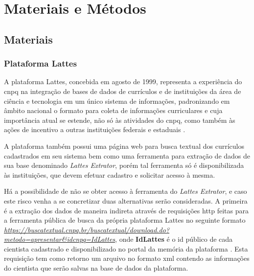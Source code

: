 \chapter{Materiais e Métodos}\label{cap:materialemetodos}

\section{Materiais}\label{sec:materiais}

\subsection{Plataforma Lattes}\label{subsec:lattes}

A plataforma Lattes, concebida em agosto de 1999, representa a experiência do \gls{cnpq} na integração de bases de dados de currículos e de instituições da área de ciência e tecnologia em um único sistema de informações, padronizando em âmbito nacional o formato para coleta de informações curriculares e cuja importância atual se estende, não só às atividades do \gls{cnpq}, como também às ações de incentivo a outras instituições federais e estaduais \cite{Lattes}.

A plataforma também possui uma página web para busca textual dos currículos cadastrados em seu sistema bem como uma ferramenta para extração de dados de sua base denominado \textit{Lattes Extrator}, porém tal ferramenta só é disponibilizada às instituições, que devem efetuar cadastro e solicitar acesso à mesma.

Há a possibilidade de não se obter acesso à ferramenta do \textit{Lattes Extrator}, e caso este risco venha a se concretizar duas alternativas serão consideradas. A primeira é a extração dos dados de maneira indireta através de requisições \gls{http} feitas para a ferramenta pública de busca da própria plataforma Lattes no seguinte formato \textit{\url{https://buscatextual.cnpq.br/buscatextual/download.do?metodo=apresentar&idcnpq=IdLattes}}, onde \textbf{IdLattes} é o id público de cada cientista cadastrado e disponibilizado no portal da memória da plataforma \cite{CnpqMemoria}. Esta requisição tem como retorno um arquivo no formato \gls{xml} contendo as informações do cientista que serão salvas na base de dados da plataforma.

